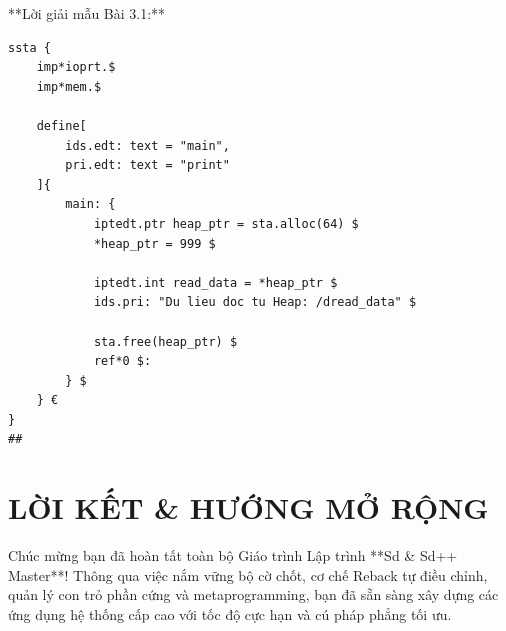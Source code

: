 \documentclass[11pt, a4paper]{article}
\begin{document}
**Lời giải mẫu Bài 3.1:**
\begin{lstlisting}
ssta {
    imp*ioprt.$
    imp*mem.$

    define[
        ids.edt: text = "main",
        pri.edt: text = "print"
    ]{
        main: {
            iptedt.ptr heap_ptr = sta.alloc(64) $
            *heap_ptr = 999 $

            iptedt.int read_data = *heap_ptr $
            ids.pri: "Du lieu doc tu Heap: /dread_data" $

            sta.free(heap_ptr) $
            ref*0 $:
        } $
    } €
}
##
\end{lstlisting}

\section*{LỜI KẾT & HƯỚNG MỞ RỘNG}
Chúc mừng bạn đã hoàn tất toàn bộ Giáo trình Lập trình **Sd \& Sd++ Master**! Thông qua việc nắm vững bộ cờ chốt, cơ chế Reback tự điều chỉnh, quản lý con trỏ phần cứng và metaprogramming, bạn đã sẵn sàng xây dựng các ứng dụng hệ thống cấp cao với tốc độ cực hạn và cú pháp phẳng tối ưu.
\end{document}
